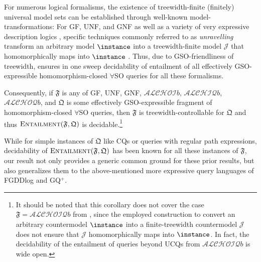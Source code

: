 \begin{example}
	For numerous logical formalisms, the existence of treewidth-finite (finitely) universal model sets can be established through well-known model-transformations: For GF, UNF, and GNF %
	as well as a variety of very expressive description logics \cite{baader_horrocks_lutz_sattler_2017,Rudolph11}, specific techniques commonly referred to as \emph{unravelling} transform an arbitrary model $\instance$ into a tree\-width-fi\-nite model $\mathcal{J}$ that homomorphically maps into $\instance$ \cite{GradelHO02,BenediktBB16,BednarczykR19,BednarczykR23,CalvaneseEO09,BourhisKR14}. 
	Thus, due to GSO-friendliness of  
	treewidth,  ensures in one sweep decidability of entailment of all effectively GSO-ex\-pres\-sible homomorphism-closed $\forall$SO queries for all these formalisms. 
	
	Consequently, if $\mathfrak{F}$ is any of GF, UNF, GNF, $\mathcal{ALCHOI}b$, $\mathcal{ALCHIQ}b$, $\mathcal{ALCHOQ}b$, and $\mathfrak{Q}$ is some effectively GSO-expressible fragment of homomorphism-closed $\forall$SO queries, then $\mathfrak{F}$ is treewidth-controllable for $\mathfrak{Q}$ and thus $\textsc{Entailment}(\mathfrak{F},\mathfrak{Q})$ is decidable.\footnote{It should be noted that this corollary does not cover the case $\mathfrak{F} = \mathcal{ALCHOIQ}b$ from , since the employed construction to convert an arbitrary countermodel $\instance$ into a finite-treewidth countermodel $\mathcal{J}$ does not ensure that $\mathcal{J}$ homomorphically maps into $\instance$. In fact, the decidability of the entailment of queries beyond UCQs from $\mathcal{ALCHOIQ}b$ is wide open.}
	
	While for simple instances of $\mathfrak{Q}$ like CQs or queries with regular path expressions, decidability of $\textsc{Entailment}(\mathfrak{F},\mathfrak{Q})$ has been known for all these instances of $\mathfrak{F}$, our result not only provides a generic common ground for these prior results, but also generalizes them to the above-mentioned more expressive query languages of FGDDlog and GQ$^+$. 
\end{example}


